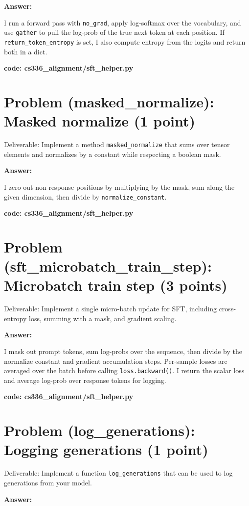 \documentclass{article}
\begin{document}
\textbf{Answer:}

I run a forward pass with \texttt{no\_grad}, apply log-softmax over the vocabulary, and use \texttt{gather} to pull the log-prob of the true next token at each position. If \texttt{return\_token\_entropy} is set, I also compute entropy from the logits and return both in a dict.

\textbf{code: cs336\_alignment/sft\_helper.py}


\section*{Problem (masked\_normalize): Masked normalize (1 point)} %
Deliverable: Implement a method \texttt{masked\_normalize} that sums over tensor elements and normalizes by a constant while respecting a boolean mask. %

\textbf{Answer:}

I zero out non-response positions by multiplying by the mask, sum along the given dimension, then divide by \texttt{normalize\_constant}.

\textbf{code: cs336\_alignment/sft\_helper.py}


\section*{Problem (sft\_microbatch\_train\_step): Microbatch train step (3 points)} %
Deliverable: Implement a single micro-batch update for SFT, including cross-entropy loss, summing with a mask, and gradient scaling. %

\textbf{Answer:}

I mask out prompt tokens, sum log-probs over the sequence, then divide by the normalize constant and gradient accumulation steps. Per-sample losses are averaged over the batch before calling \texttt{loss.backward()}. I return the scalar loss and average log-prob over response tokens for logging.

\textbf{code: cs336\_alignment/sft\_helper.py}


\section*{Problem (log\_generations): Logging generations (1 point)} %
Deliverable: Implement a function \texttt{log\_generations} that can be used to log generations from your model. %

\textbf{Answer:}
\end{document}
